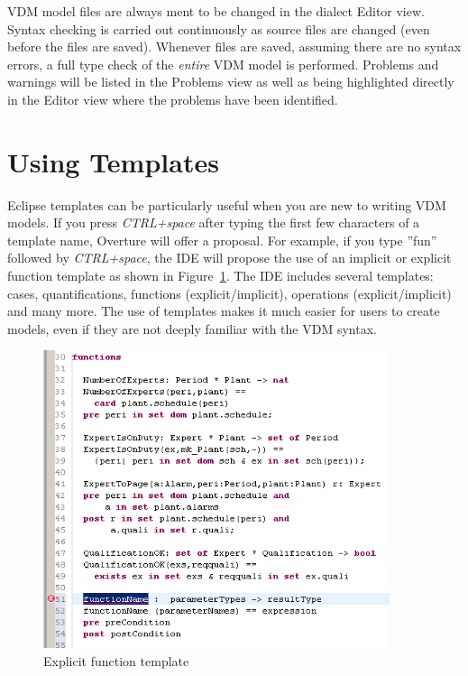 \documentclass{overturerepchap}
\begin{document}
VDM model files are always ment to be changed in the dialect Editor view. Syntax checking
is carried out continuously as source files are
changed (even before the files are saved). Whenever files are saved, assuming
there are no syntax errors, a full type check of the \emph{entire} VDM model is
performed.
Problems and warnings will be listed in the Problems view as well as
being highlighted directly in the Editor view where the problems have been
identified.


\section{Using Templates}\label{sec:templates}

Eclipse templates can be particularly useful when you are new to writing VDM models. If you
press \textit{CTRL+space} after typing the first few characters of a template name,
Overture will offer a proposal. For example, if you type ''fun'' followed
by \textit{CTRL+space}, the IDE will propose the use of an implicit or explicit
function template as shown in Figure~\ref{fig:functionTemplate}. The IDE includes
several templates: cases, quantifications, functions (explicit/implicit),
operations (explicit/implicit) and many more. The use of templates makes it much
easier for users to create models, even if they are not deeply familiar
with the VDM syntax.

\begin{figure}
\begin{center}
\includegraphics[width=4in]{figures/FunctionTemplate}
\caption{Explicit function template}
\label{fig:functionTemplate}
\end{center}
\end{figure}
\end{document}
